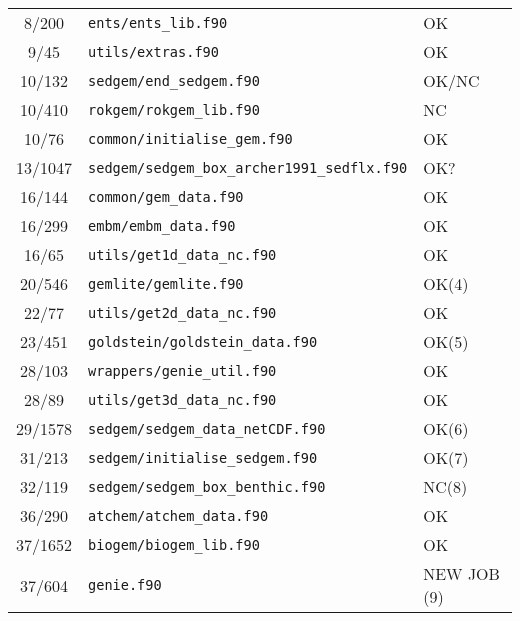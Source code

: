 \documentclass[a4paper,10pt,article]{memoir}
\begin{document}
\begin{center}
\begin{tabular}{cll}
  8/200  & \texttt{ents/ents\_lib.f90}                               & OK \\
  9/45   & \texttt{utils/extras.f90}                                 & OK \\
 10/132  & \texttt{sedgem/end\_sedgem.f90}                           & OK/NC \\
 10/410  & \texttt{rokgem/rokgem\_lib.f90}                           & NC \\
 10/76   & \texttt{common/initialise\_gem.f90}                       & OK \\
 13/1047 & \texttt{sedgem/sedgem\_box\_archer1991\_sedflx.f90}       & OK? \\
 16/144  & \texttt{common/gem\_data.f90}                             & OK \\
 16/299  & \texttt{embm/embm\_data.f90}                              & OK \\
 16/65   & \texttt{utils/get1d\_data\_nc.f90}                        & OK \\
 20/546  & \texttt{gemlite/gemlite.f90}                              & OK(4) \\
 22/77   & \texttt{utils/get2d\_data\_nc.f90}                        & OK \\
 23/451  & \texttt{goldstein/goldstein\_data.f90}                    & OK(5) \\
 28/103  & \texttt{wrappers/genie\_util.f90}                         & OK \\
 28/89   & \texttt{utils/get3d\_data\_nc.f90}                        & OK \\
 29/1578 & \texttt{sedgem/sedgem\_data\_netCDF.f90}                  & OK(6) \\
 31/213  & \texttt{sedgem/initialise\_sedgem.f90}                    & OK(7) \\
 32/119  & \texttt{sedgem/sedgem\_box\_benthic.f90}                  & NC(8) \\
 36/290  & \texttt{atchem/atchem\_data.f90}                          & OK \\
 37/1652 & \texttt{biogem/biogem\_lib.f90}                           & OK \\
 37/604  & \texttt{genie.f90}                                        & NEW JOB (9) \\
\end{tabular}
\end{center}
\end{document}
